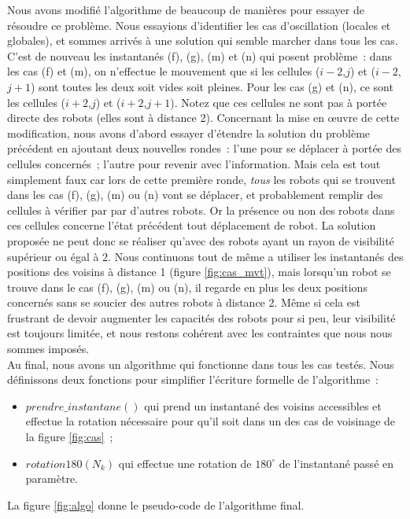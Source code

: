 Nous avons modifié l'algorithme de beaucoup de manières pour essayer de
résoudre ce problème. Nous essayions d'identifier les cas d'oscillation
(locales et globales), et sommes arrivés à une solution qui semble marcher dans
tous les cas. C'est de nouveau les instantanés (f), (g), (m) et (n) qui posent
problème~: dans les cas (f) et (m), on n'effectue le mouvement que si les
cellules ($i-2$,$j$) et ($i-2$,$j+1$) sont toutes les deux soit vides soit
pleines. Pour les cas (g) et (n), ce sont les cellules ($i+2$,$j$) et
($i+2$,$j+1$). Notez que ces cellules ne sont pas à portée directe des robots
(elles sont à distance 2). Concernant la mise en \oe{}uvre de cette
modification, nous avons d'abord essayer d'étendre la solution du problème
précédent en ajoutant deux nouvelles rondes~: l'une pour se déplacer à portée
des cellules concernés~; l'autre pour revenir avec l'information. Mais cela est
tout simplement faux car lors de cette première ronde, \textit{tous} les robots
qui se trouvent dans les cas (f), (g), (m) ou (n) vont se déplacer, et
probablement remplir des cellules à vérifier par par d'autres robots. Or la
présence ou non des robots dans ces cellules concerne l'état précédent tout
déplacement de robot. La solution proposée ne peut donc se réaliser qu'avec des
robots ayant un rayon de visibilité supérieur ou égal à 2. Nous continuons tout
de même a utiliser les instantanés des positions des voisins à distance 1
(figure \ref{fig:cas_mvt}), mais lorsqu'un robot se trouve dans le cas (f),
(g), (m) ou (n), il regarde en plus les deux positions concernés sans se
soucier des autres robots à distance 2. Même si cela est frustrant de devoir
augmenter les capacités des robots pour si peu, leur visibilité est toujours
limitée, et nous restons cohérent avec les contraintes que nous nous sommes
imposés. \\

Au final, nous avons un algorithme qui fonctionne dans tous les cas testés.
Nous définissons deux fonctions pour simplifier l'écriture formelle de
l'algorithme~:
\begin{itemize}
  \item $prendre\_instantane()$ qui prend un instantané des voisins accessibles
  et effectue la rotation nécessaire pour qu'il soit dans un des cas de
  voisinage de la figure \ref{fig:cas}~;
  \item $rotation180(N_k)$ qui effectue une rotation de $180^\circ{}$ de
  l'instantané passé en paramètre.
\end{itemize}
La figure \ref{fig:algo} donne le pseudo-code de l'algorithme final. \\

